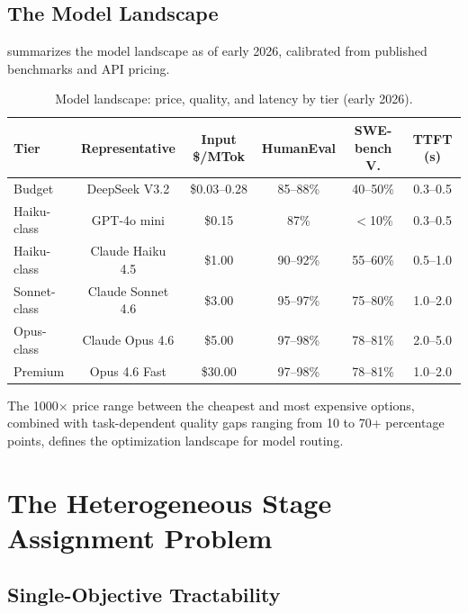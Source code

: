 \documentclass[11pt, a4paper, logo, copyright]{googledeepmind}
\begin{document}
\subsection{The Model Landscape}

 summarizes the model landscape as of early 2026, calibrated from published benchmarks and API pricing.

\begin{table}[htbp]
\centering
\caption{Model landscape: price, quality, and latency by tier (early 2026).}
\label{tab:landscape}
\begin{tabular}{lccccc}
\toprule
\textbf{Tier} & \textbf{Representative} & \textbf{Input \$/MTok} & \textbf{HumanEval} & \textbf{SWE-bench V.} & \textbf{TTFT (s)} \\
\midrule
Budget & DeepSeek V3.2 & \$0.03--0.28 & 85--88\% & 40--50\% & 0.3--0.5 \\
Haiku-class & GPT-4o mini & \$0.15 & 87\% & $<$10\% & 0.3--0.5 \\
Haiku-class & Claude Haiku 4.5 & \$1.00 & 90--92\% & 55--60\% & 0.5--1.0 \\
Sonnet-class & Claude Sonnet 4.6 & \$3.00 & 95--97\% & 75--80\% & 1.0--2.0 \\
Opus-class & Claude Opus 4.6 & \$5.00 & 97--98\% & 78--81\% & 2.0--5.0 \\
Premium & Opus 4.6 Fast & \$30.00 & 97--98\% & 78--81\% & 1.0--2.0 \\
\bottomrule
\end{tabular}
\end{table}

The 1000$\times$ price range between the cheapest and most expensive options, combined with task-dependent quality gaps ranging from 10 to 70+ percentage points, defines the optimization landscape for model routing.


\section{The Heterogeneous Stage Assignment Problem}
\label{sec:assignment}

\subsection{Single-Objective Tractability}
\end{document}

